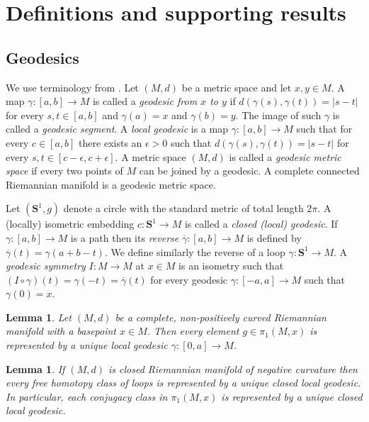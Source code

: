 \documentclass[12pt]{amsart}
\newcommand{\B}[1]{{\mathbf #1}}
\newtheorem{lemma}[subsection]{Lemma}
\theoremstyle{definition}
\theoremstyle{remark}
\numberwithin{figure}{section}
\numberwithin{table}{section}
\numberwithin{equation}{section}
\begin{document}
\section{Definitions and supporting results}\label{S:definitions}

\subsection{Geodesics}
We use terminology from \cite{MR1744486}. Let $(M,d)$ be a metric space and let
$x,y\in M$.  A map $\gamma\colon [a,b]\to M$ is called a {\em geodesic from $x$
to $y$} if $d(\gamma(s),\gamma(t))=|s-t|$ for every $s,t\in [a,b]$ and
$\gamma(a)=x$ and $\gamma(b)=y$. The image of such $\gamma$ is called a {\em
geodesic segment}. A {\em local geodesic} is a map $\gamma\colon [a,b]\to M$
such that for every $c\in [a,b]$ there exists an $\epsilon>0$ such
that $d(\gamma(s),\gamma(t))=|s-t|$ for every $s,t\in [c-\epsilon,c+\epsilon]$.
A metric space $(M,d)$ is called a {\em geodesic metric space} if every two
points of $M$ can be joined by a geodesic. A complete connected Riemannian manifold
is a geodesic metric space. 


Let $(\B S^1,g)$ denote a circle with the standard metric of total length $2\pi$.
A (locally) isometric embedding $c\colon \B S^1\to M$ is called a {\em
closed (local) geodesic}. 
If $\gamma\colon [a,b]\to M$ is a path then its {\em reverse}
$\overline{\gamma}\colon [a,b]\to M$ is defined by
$\overline{\gamma}(t)=\gamma(a+b-t)$. We define similarly the reverse of a loop
$\gamma\colon \B S^1\to M$.
A {\em geodesic symmetry} $I\colon M\to M$ at $x\in M$ is an isometry such
that $(I\circ \gamma)(t) = \gamma(-t)=\overline{\gamma}(t)$ 
for every geodesic $\gamma\colon [-a,a]\to M$ such that $\gamma(0)=x$.


\begin{lemma}\cite[Theorem 4.13, Chapter II.4]{MR1744486}\label{L:geodesic-rep}
Let $(M,d)$ be a complete, non-positively curved Riemannian manifold with
a basepoint $x\in M$. Then every element $g\in \pi_1(M,x)$ is
represented by a unique local geodesic $\gamma\colon [0,a]\to M$.
\end{lemma}

\begin{lemma}\cite[Theorem 3.8.14]{MR1330918}\label{L:closed-geodesic}
If $(M,d)$ is closed Riemannian manifold of negative curvature then
every free homotopy class of loops is represented by a unique closed
local geodesic. In particular, each conjugacy class in $\pi_1(M,x)$ is
represented by a unique closed local geodesic.
\end{lemma}
\end{document}
